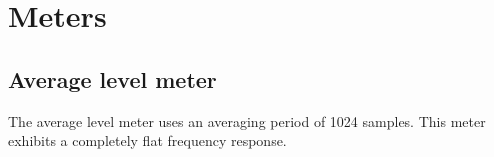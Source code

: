






\chapter{Meters}
\label{chap:meters}

\section{Average level meter}

The average level meter uses an averaging period of \num{1024}
samples.  This meter exhibits a completely flat frequency response.

